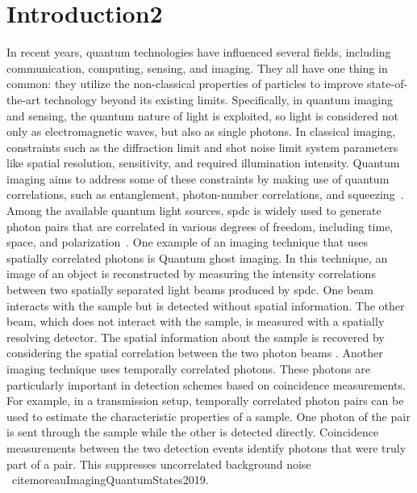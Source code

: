 \section{Introduction2}

In recent years, quantum technologies have influenced several fields, including communication, computing, sensing, and imaging. They all have one thing in common: they utilize the non-classical properties of particles to improve state-of-the-art technology beyond its existing limits. \newline
Specifically, in quantum imaging and sensing, the quantum nature of light is exploited, so light is considered not only as electromagnetic waves, but also as single photons. \newline
In classical imaging, constraints such as the diffraction limit and shot noise limit system parameters like spatial resolution, sensitivity, and required illumination intensity. 
Quantum imaging aims to address some of these constraints by making use of quantum correlations, such as entanglement, photon-number correlations, and squeezing~\cite{defienneAdvancesQuantumImaging2024,moreauImagingQuantumStates2019}. \newline
Among the available quantum light sources, \acrfull{spdc} is widely used to generate photon pairs that are correlated in various degrees of freedom, including time, space, and polarization~\cite{moreauImagingQuantumStates2019}. \newline
One example of an imaging technique that uses spatially correlated photons is Quantum ghost imaging. In this technique, an image of an object is reconstructed by measuring the intensity correlations between two spatially separated light beams produced by \acrshort{spdc}. One beam interacts with the sample but is detected without spatial information. The other beam, which does not interact with the sample, is measured with a spatially resolving detector. The spatial information about the sample is recovered by considering the spatial correlation between the two photon beams \cite{gilabertebassetPerspectivesApplicationsQuantum2019,lemosQuantumImagingUndetected2014}. \newline
Another imaging technique uses temporally correlated photons.
These photons are particularly important in detection schemes based on coincidence measurements. For example, in a transmission setup, temporally correlated photon pairs can be used to estimate the characteristic properties of a sample. \newline
One photon of the pair is sent through the sample while the other is detected directly. Coincidence measurements between the two detection events identify photons that were truly part of a pair. This suppresses uncorrelated background noise ~cite{moreauImagingQuantumStates2019}. \newline
